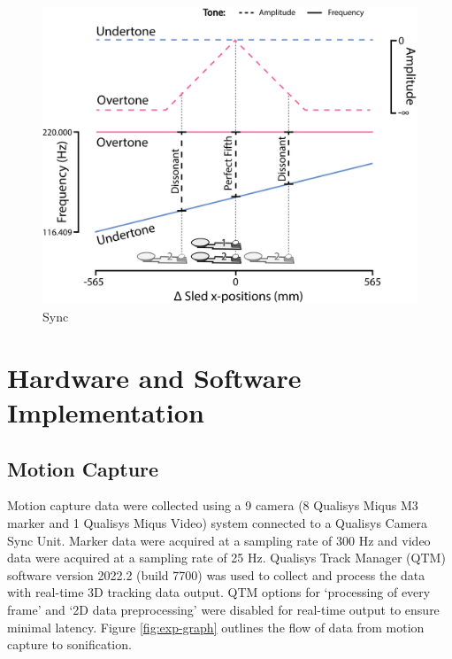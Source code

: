 \documentclass[10pt,a4paper,onecolumn]{article}
\begin{document}
\begin{figure}[h]

{\centering \includegraphics[width=1\linewidth]{figures/sync_sonif_illustration} 

}

\caption{Sync}\label{fig:sync-illustration}
\end{figure}

\hypertarget{hardware-and-software-implementation}{%
\section{Hardware and Software Implementation}\label{hardware-and-software-implementation}}

\hypertarget{motion-capture}{%
\subsection{Motion Capture}\label{motion-capture}}

Motion capture data were collected using a 9 camera (8 Qualisys Miqus M3 marker and 1 Qualisys Miqus Video) system connected to a Qualisys Camera Sync Unit. Marker data were acquired at a sampling rate of 300 Hz and video data were acquired at a sampling rate of 25 Hz. Qualisys Track Manager (QTM) software version 2022.2 (build 7700) was used to collect and process the data with real-time 3D tracking data output. QTM options for `processing of every frame' and `2D data preprocessing' were disabled for real-time output to ensure minimal latency. Figure \ref{fig:exp-graph} outlines the flow of data from motion capture to sonification.
\end{document}
